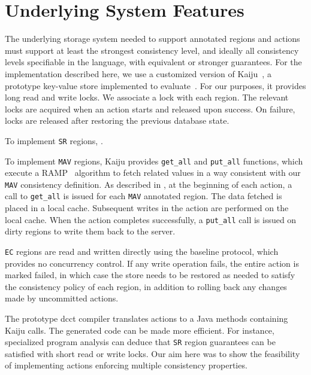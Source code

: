 \documentclass[preprint,numbers]{sigplanconf}
\begin{document}
\section{Underlying System Features}
\label{sec:underlyingsys}
The underlying storage system needed to support annotated regions and actions must
support at least the strongest consistency level, and ideally all consistency
levels specifiable in the language, with equivalent or stronger
guarantees. For the implementation described here, we use a customized
version of Kaiju~\cite{kaiju}, a prototype key-value store implemented to
evaluate~\cite{bailis2014scalable}. For our purposes, it provides long read and
write locks. We associate a lock with each region. The relevant locks are acquired when an
action starts and released upon success. On failure, locks are
released after restoring the previous database state.

To implement \texttt{SR} regions, .

To implement \texttt{MAV}
regions, Kaiju provides
\texttt{get\_all} and \texttt{put\_all} functions, which execute a
RAMP~\cite{??}
algorithm
to fetch related values in a way consistent with our \texttt{MAV} consistency
definition. As described in \cite{bailis2014scalable}, at the beginning of
each action, a call to
\texttt{get\_all} is issued for each \texttt{MAV} annotated region.
The data fetched
is placed in a local cache. Subsequent writes in the action are performed on
the local cache. When the action completes successfully, a
\texttt{put\_all} call
is issued on dirty regions to write them back to the server.

\texttt{EC}
regions are read and written directly using the baseline protocol, which
provides no concurrency control. If any write operation fails, the
entire action is marked failed, in which case the store needs to be restored as
needed to satisfy the consistency policy of each region, in addition to rolling
back any changes made by uncommitted actions.

The prototype dcct compiler translates
actions to a Java methods containing Kaiju calls.
The generated code can be made more 
efficient. For instance, specialized program analysis can deduce that
\texttt{SR} 
region guarantees can be satisfied with short read or write locks. Our aim here
was to show the feasibility of implementing actions enforcing multiple
consistency properties.
\end{document}
